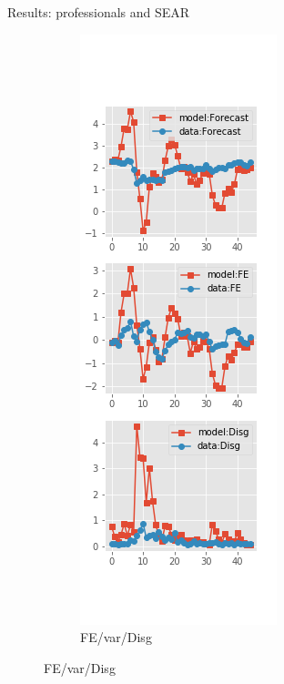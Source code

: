 \documentclass{beamer}
\begin{document}
\begin{frame}{Results: professionals and SEAR}
\begin{figure}[ht]
\begin{subfigure}[b]{0.19\textwidth}
		\end{subfigure}
		\hfill
		\begin{subfigure}[b]{0.19\textwidth}
			\caption{FE/var/Disg}
			\includegraphics[width=\textwidth, height = 0.8\textheight]{figuresDraft/spf_se_est_diag4.png}
		\end{subfigure}
	\end{figure}
\end{frame}
\end{document}
